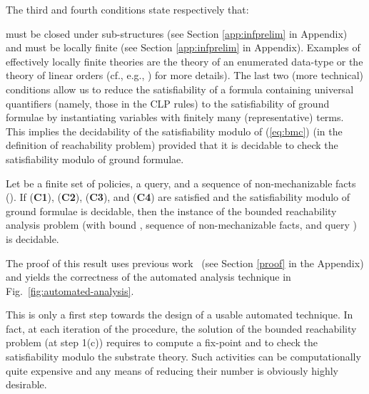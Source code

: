 \documentclass[conference]{llncs}
\begin{document}
The third and fourth conditions state  respectively that:   { must be closed under sub-structures (see Section \ref{app:infprelim} in Appendix) and 
 must be {locally finite} (see Section \ref{app:infprelim} in Appendix). 
Examples of effectively locally finite
theories are the theory of an enumerated data-type or the theory of
linear orders (cf., e.g., \cite{jsc-ftp09}) for more details).
The last two (more technical) conditions allow us to reduce the
satisfiability of a formula containing universal quantifiers (namely,
those in the CLP rules) to the satisfiability of ground formulae by
instantiating variables with finitely many (representative) terms.
This implies the decidability of the satisfiability modulo
 of (\ref{eq:bmc}) (in the definition of reachability
problem) provided that it is decidable to check the satisfiability
modulo  of ground formulae.
\begin{theorem}
\label{thm3}
  Let  be a finite set of policies,  a query, and
   a sequence of non-mechanizable facts ().  If (\textbf{C1}), (\textbf{C2}), (\textbf{C3}), and
  (\textbf{C4}) are satisfied and the satisfiability modulo
   of ground formulae is decidable, then the instance
  of the bounded reachability analysis problem (with bound ,
  sequence  of non-mechanizable facts, and query
  ) is decidable.
\end{theorem}
The proof of this result uses previous work~\cite{jsc-ftp09} (see Section \ref{proof} in the Appendix)
and yields the correctness of the automated analysis technique in
Fig.~\ref{fig:automated-analysis}.  

This is only a first step towards
the design of a usable automated technique.  In fact, at each
iteration of the procedure, the solution of the bounded reachability
problem (at step 1(c)) requires to compute a fix-point and to check
the satisfiability modulo the substrate theory.  Such activities can
be computationally quite expensive and any means of reducing their
number is obviously highly desirable.



}
\end{document}
